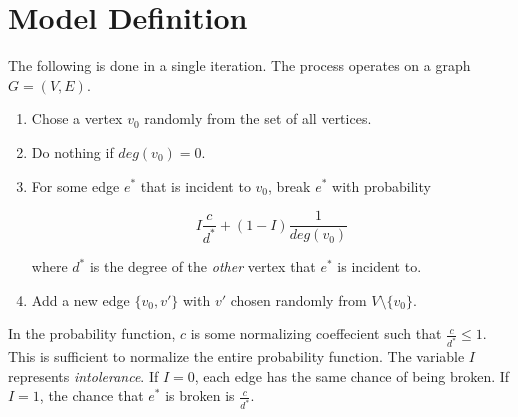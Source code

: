 \documentclass[a4paper,10pt]{article}
\title{}
\author{}
\begin{document}
\section{Model Definition}

The following is done in a single iteration. The process operates on a graph $G = (V, E)$.

\begin{enumerate}
 \item Chose a vertex $v_0$ randomly from the set of all vertices. 
 \item Do nothing if $deg(v_0) = 0$. 
 \item For some edge $e^*$ that is incident to $v_0$, break $e^*$ with probability

 \begin{equation}
  I \frac{c}{d^*} + (1 - I)\frac{1}{deg(v_0)}
 \end{equation}

where $d^*$ is the degree of the \emph{other} vertex that $e^*$ is incident to. 

 \item Add a new edge $\{v_0, v'\}$ with $v'$ chosen randomly from $V \setminus \{v_0\}$.

\end{enumerate}

In the probability function, $c$ is some normalizing coeffecient such that $\frac{c}{d^*} \leq 1$. This is sufficient to normalize the entire probability function. The variable $I$ represents \emph{intolerance}. If $I = 0$, each edge has the same chance of being broken. If $I = 1$, the chance that $e^*$ is broken is $\frac{c}{d^*}$.
\end{document}

